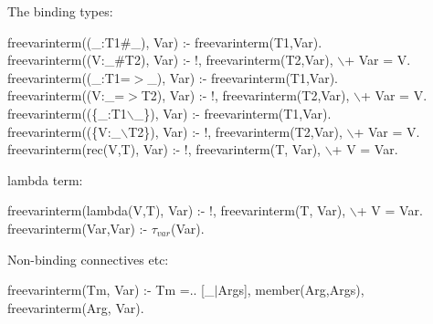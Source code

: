 \documentclass[11pt]{report}
\begin{document}
 The binding types:
\begin{sf}\begin{tabbing}
freevarinterm((\_\hspace{0.1em}:T1\#\_\hspace{0.1em}), Var) :- freevarinterm(T1,Var).\\[-0.15ex]
freevarinterm((V:\_\hspace{0.1em}\#T2), Var) :- !, freevarinterm(T2,Var), $\backslash$+ Var = V.\\[-0.15ex]
freevarinterm((\_\hspace{0.1em}:T1=$>$\_\hspace{0.1em}), Var) :- freevarinterm(T1,Var).\\[-0.15ex]
freevarinterm((V:\_\hspace{0.1em}=$>$T2), Var) :- !, freevarinterm(T2,Var), $\backslash$+ Var = V.\\[-0.15ex]
freevarinterm((\{\_\hspace{0.1em}:T1$\backslash$\_\hspace{0.1em}\}), Var) :- freevarinterm(T1,Var).\\[-0.15ex]
freevarinterm((\{V:\_\hspace{0.1em}$\backslash$T2\}), Var) :- !, freevarinterm(T2,Var), $\backslash$+ Var = V.\\[-0.15ex]
freevarinterm(rec(V,T), Var) :- !, freevarinterm(T, Var), $\backslash$+ V = Var.
\end{tabbing}\end{sf}

 lambda term:
\begin{sf}\begin{tabbing}
freevarinterm(lambda(V,T), Var) :- !, freevarinterm(T, Var), $\backslash$+ V = Var.\\[-0.15ex]
freevarinterm(Var,Var) :- $\tau_{var}$(Var).
\end{tabbing}\end{sf}

 Non-binding connectives etc:
\begin{sf}\begin{tabbing}
freevarinterm(Tm, Var) :- Tm =.. [\_\hspace{0.1em}$\mid$Args], member(Arg,Args), freevarinterm(Arg, Var).\\[-0.7ex]

\end{tabbing}\end{sf}
\end{document}
